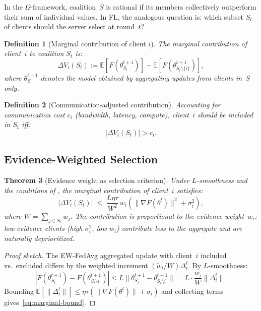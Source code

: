 \documentclass[11pt,a4paper]{article}
\newtheorem{theorem}{Theorem}[section]
\newtheorem{definition}[theorem]{Definition}
\newcommand{\E}{\mathbb{E}}
\newcommand{\norm}[1]{\|#1\|}
\begin{document}
In the $\Omega$-framework, coalition~$S$ is rational if its members
collectively outperform their sum of individual values. In FL, the
analogous question is: which subset $S_t$ of clients should the server
select at round~$t$?

\begin{definition}[Marginal contribution of client $i$]\label{def:marginal}
The marginal contribution of client~$i$ to coalition $S_t$ is:
\begin{equation}\label{eq:marginal}
  \Delta V_i(S_t) := \E[F(\theta_{S_t}^{t+1})] - \E[F(\theta_{S_t \setminus \{i\}}^{t+1})],
\end{equation}
where $\theta_S^{t+1}$ denotes the model obtained by aggregating updates
from clients in~$S$ only.
\end{definition}

\begin{definition}[Communication-adjusted contribution]\label{def:comm-adj}
Accounting for communication cost $c_i$ (bandwidth, latency, compute),
client~$i$ should be included in $S_t$ iff:
\begin{equation}\label{eq:rational-inclusion}
  |\Delta V_i(S_t)| > c_i.
\end{equation}
\end{definition}

\subsection{Evidence-Weighted Selection}

\begin{theorem}[Evidence weight as selection criterion]\label{thm:selection}
Under $L$-smoothness and the conditions of , the
marginal contribution of client~$i$ satisfies:
\begin{equation}\label{eq:marginal-bound}
  |\Delta V_i(S_t)| \;\leq\; \frac{L\eta\tau}{W^2}\,w_i
  \left(\norm{\nabla F(\theta^t)}^2 + \sigma_i^2\right),
\end{equation}
where $W = \sum_{j \in S_t} w_j$. The contribution is proportional to
the evidence weight~$w_i$: low-evidence clients (high $\sigma_i^2$, low
$w_i$) contribute less to the aggregate and are naturally deprioritized.
\end{theorem}

\begin{proof}[Proof sketch]
The EW-FedAvg aggregated update with client~$i$ included vs.\ excluded
differs by the weighted increment $(\tilde{w}_i / W) \Delta_i^t$. By
$L$-smoothness:
\[
  |F(\theta_{S_t}^{t+1}) - F(\theta_{S_t \setminus i}^{t+1})|
  \leq L\norm{\theta_{S_t}^{t+1} - \theta_{S_t \setminus i}^{t+1}}
  = L \cdot \frac{w_i}{W} \norm{\Delta_i^t}.
\]
Bounding $\E[\norm{\Delta_i^t}] \leq \eta\tau(\norm{\nabla F(\theta^t)} + \sigma_i)$
and collecting terms gives~\eqref{eq:marginal-bound}.
\end{proof}
\end{document}
